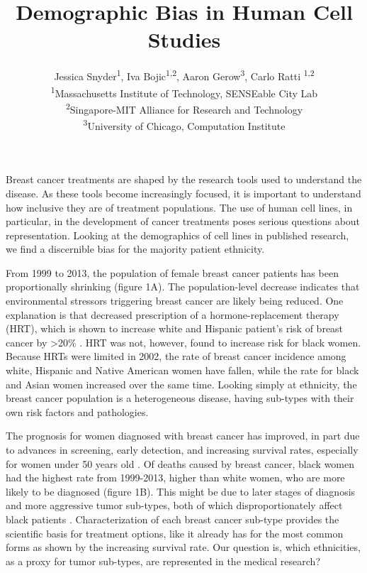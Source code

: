\documentclass[10pt]{article}
\begin{document}
\title{Demographic Bias in Human Cell Studies}
\author{Jessica Snyder\textsuperscript{1}, Iva Bojic\textsuperscript{1,2}, Aaron Gerow\textsuperscript{3}, Carlo Ratti  \textsuperscript{1,2 } \\ \textsuperscript{1}Massachusetts Institute of Technology, SENSEable City Lab \\ \textsuperscript{2}Singapore-MIT Alliance for Research and Technology \\ \textsuperscript{3}University of Chicago, Computation Institute}

\maketitle

\begin{multicols}{2}
Breast cancer treatments are shaped by the research tools used to understand the disease. As these tools become increasingly focused, it is important to understand how inclusive they are of treatment populations. The use of human cell lines, in particular, in the development of cancer treatments poses serious questions about representation. Looking at the demographics of cell lines in published research, we find a discernible bias for the majority patient ethnicity.

From 1999 to 2013, the population of female breast cancer patients has been proportionally shrinking (figure 1A). The population-level decrease indicates that environmental stressors triggering breast cancer are likely being reduced. One explanation is that decreased prescription of a hormone-replacement therapy (HRT), which is shown to increase white and Hispanic patient's risk of breast cancer by >20\% \cite{million2003breast}. HRT was not, however, found to increase risk for black women. Because HRTs were limited in 2002, the rate of breast cancer incidence among white, Hispanic and Native American women have fallen, while the rate for black and Asian women increased over the same time. Looking simply at ethnicity, the breast cancer population is a heterogeneous disease, having sub-types with their own risk factors and pathologies. 

The prognosis for women diagnosed with breast cancer has improved, in part due to advances in screening, early detection, and increasing survival rates, especially for women under 50 years old \cite{etzioni2003case}. Of deaths caused by breast cancer, black women had the highest rate from 1999-2013, higher than white women, who are more likely to be diagnosed (figure 1B). This might be due to later stages of diagnosis and more aggressive tumor sub-types, both of which disproportionately affect black patients \cite{batina2013variation}. Characterization of each breast cancer sub-type provides the scientific basis for treatment options, like it already has for the most common forms as shown by the increasing survival rate. Our question is, which ethnicities, as a proxy for tumor sub-types, are represented in the medical research?%


\end{multicols}
\end{document}
